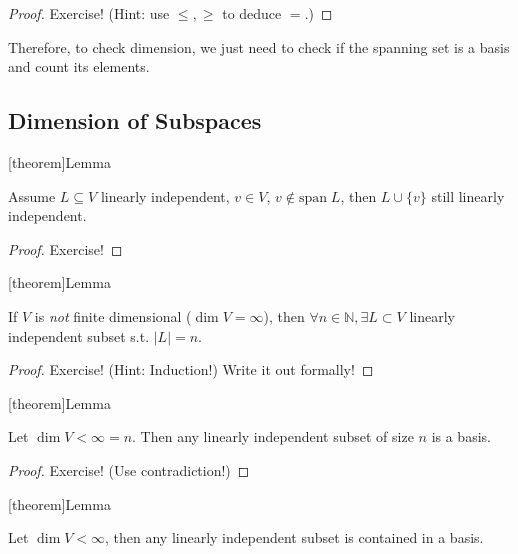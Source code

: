 \documentclass[12pt]{report}
\theoremstyle{definition}
\begin{document}
\begin{proof}
    Exercise! (Hint: use $\le, \ge$ to deduce $=$.)
\end{proof}

Therefore, to check dimension,
we just need to check if the spanning set is a basis and count its elements.

\subsection{Dimension of Subspaces}

[theorem]{Lemma}
\begin{linearly independent subset of V}
    Assume $L \subseteq V$ linearly independent, $v \in V$,
    $v \notin \text{span}\;L$,
    then $L \cup \{v\}$ still linearly independent.
\end{linearly independent subset of V}

\begin{proof}
    Exercise!
\end{proof}

[theorem]{Lemma}
\begin{infinite dimension find basis subset}
    If $V$ is \emph{not} finite dimensional ($\dim{V} = \infty$),
    then $\forall n\in \mathbb{N}, \exists L \subset V$ 
    linearly independent subset s.t. $|L| = n$.
\end{infinite dimension find basis subset}

\begin{proof}
    Exercise! (Hint: Induction!) Write it out formally!
\end{proof}

[theorem]{Lemma}
\begin{linearly independent subset of size n}
    Let $\dim{V} < \infty = n$. Then any linearly independent subset of size $n$ is a basis.
\end{linearly independent subset of size n}

\begin{proof}
    Exercise! (Use contradiction!)
\end{proof}

[theorem]{Lemma}
\begin{linearly independent subset is contained in basis}
    Let $\dim{V} < \infty$, then any linearly independent subset is contained in a basis.
\end{linearly independent subset is contained in basis}
\end{document}
